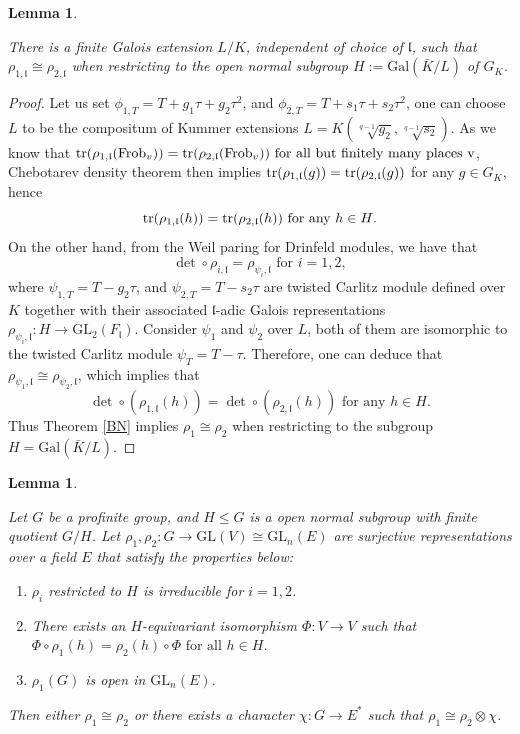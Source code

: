 \documentclass[20pt, oneside]{article}   	%
\newtheorem{lem}[thm]{Lemma}
\theoremstyle{definition}
\newcommand{\fl}{\mathfrak{l}}
\newcommand{\Gal}{\mathrm{Gal}}
\newcommand{\GL}{\mathrm{GL}}
\begin{document}
\begin{lem}\label{existh}

There is a finite Galois extension $L/K$, independent of choice of $\fl$, such that $\rho_{1,\fl}\cong\rho_{2,\fl}$ when restricting to the open normal subgroup $H:=\Gal(\bar{K}/L)$ of $G_K$.

\end{lem}
\begin{proof}
Let us set $\phi_{1,T}=T+g_1\tau+g_2\tau^2$, and $\phi_{2,T}=T+s_1\tau+s_2\tau^2$, one can choose $L$ to be the compositum of Kummer extensions $L=K(\sqrt[q-1]{g_2},\sqrt[q-1]{s_2})$.
As we know that ${\rm tr}(\rho_{1, \fl}({\rm Frob}_v))={\rm tr}(\rho_{2, \fl}({\rm Frob}_v))\textrm{ for all but finitely many places v}$, Chebotarev density theorem then implies ${\rm tr}(\rho_{1,\fl}(g))={\rm tr}(\rho_{2,\fl}(g))$ for any $g\in G_K$, hence $${\rm tr}(\rho_{1,\fl}(h))={\rm tr}(\rho_{2,\fl}(h)) \textrm{ for any $h\in H$}.$$
 On the other hand, from the Weil paring for Drinfeld modules, we have that $$\det\circ\rho_{i,\fl}=\rho_{\psi_i,\fl} \textrm{ for $i=1,2$},$$ where $\psi_{1,T}=T-g_2\tau$, and $\psi_{2,T}=T-s_2\tau$ are twisted Carlitz module defined over $K$ together with their associated $\fl$-adic Galois representations $\rho_{\psi_i,\fl}:H\rightarrow \GL_2(F_\fl)$. Consider $\psi_1$ and $\psi_2$ over $L$, both of them are isomorphic to the twisted Carlitz module $\psi_T=T-\tau$. Therefore, one can deduce that $\rho_{\psi_1,\fl}\cong\rho_{\psi_2,\fl}$, which implies that $$\det\circ(\rho_{1,\fl}(h))=\det\circ(\rho_{2,\fl}(h)) \textrm{ for any $h\in H$}.$$ 
Thus Theorem \ref{BN} implies $\rho_1\cong\rho_2$ when restricting to the subgroup $H=\Gal(\bar{K}/L)$.

\end{proof}


\begin{lem}\label{1coho}

Let $G$ be a profinite group, and $H\leqslant G$ is a open normal subgroup with finite quotient $G/H$. Let $\rho_1, \rho_2: G\rightarrow \GL(V)\cong \GL_n(E)$ are surjective representations over a field $E$ that satisfy the properties below:
\begin{enumerate}
\item $\rho_i$ restricted to $H$ is irreducible for $i=1,2$.
\item There exists an $H$-equivariant isomorphism $\Phi:V\rightarrow V$ such that $\Phi\circ\rho_1(h)=\rho_2(h)\circ\Phi\textrm{ for all $h\in H$}$. 
\item $\rho_1(G)$ is open in $\mathrm{GL}_n(E)$.
\end{enumerate}
Then either $\rho_1\cong\rho_2$ or there exists a character $\chi:G\rightarrow E^*$ such that $\rho_1\cong\rho_2\otimes \chi$.





\end{lem}
\end{document}

